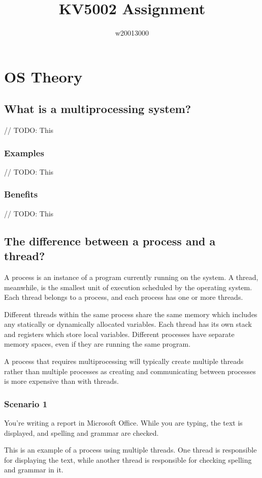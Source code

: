 \documentclass{article}
\title{KV5002 Assignment}
\author{w20013000}
\date{}
\begin{document}
\maketitle

\section{OS Theory}
    \subsection{What is a multiprocessing system?}
    // TODO: This
    \subsubsection{Examples}
    // TODO: This
    \subsubsection{Benefits}
    // TODO: This

\subsection{The difference between a process and a thread?}
A process is an instance of a program currently running on the system.
A thread, meanwhile, is the smallest unit of execution scheduled by the operating system.
Each thread belongs to a process, and each process has one or more threads.

Different threads within the same process share the same memory which includes any
statically or dynamically allocated variables. Each thread has its own stack and registers
which store local variables.
Different processes have separate memory spaces, even if they are running the same program.

A process that requires multiprocessing will typically create multiple threads
rather than multiple processes as creating and communicating between processes is
more expensive than with threads.

    \subsubsection{Scenario 1}
    You're writing a report in Microsoft Office. While you are typing, the text is
    displayed, and spelling and grammar are checked.

    This is an example of a process using multiple threads.
    One thread is responsible for displaying the text, while another thread is responsible
    for checking spelling and grammar in it.
\end{document}
